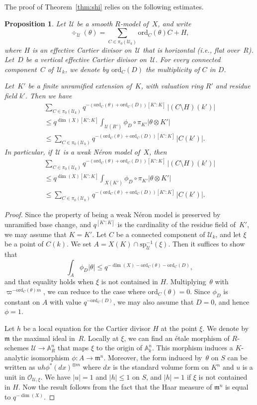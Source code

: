 \documentclass[11pt]{article}
\let\mathcal\mathscr
\newtheorem{prop}[equation]{Proposition}
\theoremstyle{definition}
\numberwithin{equation}{subsection}
\newcommand{\A}{\ensuremath{\mathbb{A}}}
\newcommand{\cU}{\ensuremath{\mathscr{U}}}
\newcommand{\ord}{\mathrm{ord}}
\newcommand{\spe}{\mathrm{sp}}
\let\form\theta
\let\unif\varpi
\begin{document}
The proof of Theorem~\ref{thm:shi} relies on the following estimates.
\begin{prop}\label{prop:int}
Let~$\cU$ be a smooth $R$\nobreakdash-model of~$X$, and write
\[
\div_{\cU}(\form)=\sum_{C\in \pi_0(\cU_k)}\ord_C(\form)C+H,
\]
where $H$ is an effective Cartier divisor on~$\cU$ that is horizontal (i.e., flat over~$R$).
Let~$D$ be a vertical effective Cartier divisor on~$\cU$. For every connected component~$C$ of~$\cU_k$, we denote by $\ord_C(D)$ the multiplicity of $C$ in $D$.

Let~$K'$ be a finite unramified extension of~$K$, with valuation ring $R'$ and residue field $k'$.
Then we have
\begin{multline*}
\sum_{C\in \pi_0(\cU_k)}q^{-(\ord_C(\form)+\ord_C(D))[K'\colon K]}\,|(C\setminus H)(k')|\\[-8pt]
\leq q^{\dim(X)[K'\colon K]} \int_{\cU(R')}\phi_D\circ\pi_{K'} |\form\otimes K'| \\
\leq \sum_{C\in \pi_0(\cU_k)}q^{-(\ord_C(\form)+\ord_C(D))[K'\colon K]}\,|C(k')|.
\end{multline*}
In particular, if~$\cU$ is a weak Néron model of~$X$, then
\begin{multline*}
\sum_{C\in \pi_0(\cU_k)}q^{-(\ord_C(\form)+\ord_C(D))[K'\colon K]}\,|(C\setminus H)(k')|\\[-8pt]
\leq q^{\dim(X)[K'\colon K]} \int_{X(K')}\phi_D\circ\pi_{K'} |\form\otimes K'| \\
\leq \sum_{C\in \pi_0(\cU_k)}q^{-(\ord_C(\form)+\ord_C(D))[K'\colon K]}\,|C(k')|.
\end{multline*}
\end{prop}
\begin{proof}
Since the property of being a weak Néron model is preserved by unramified base change, and $q^{[K'\colon K]}$ is the cardinality of the residue field of~$K'$, we may assume that $K=K'$.
Let $C$ be a connected component of $\cU_k$, and let $\xi$ be a point of $C(k)$.
We set $A=X(K)\cap \spe_{\cU}^{-1}(\xi)$.
Then it suffices to show that
\[
\int_{A}\phi_D|\form| \leq q^{-\dim(X)-\ord_C(\form)-\ord_C(D)},
\]
and that equality holds when $\xi$ is not contained in $H$. Multiplying~$\form$ with $\unif^{-\ord_C(\form)m}$, we can reduce to the case where
$\ord_C(\form)=0$. Since $\phi_D$ is constant on $A$ with value $q^{-\ord_C(D)}$, we may also assume that $D=0$, and hence $\phi=1$.

Let $h$ be a local equation for the Cartier divisor $H$ at the point $\xi$.
We denote by~$\mathfrak{m}$ the maximal ideal in~$R$.
Locally at $\xi$, we can find an étale morphism of $R$\nobreakdash-schemes $\cU\to \A^n_R$ that maps $\xi$ to the origin of $\A^n_k$.
This morphism induces a $K$\nobreakdash-analytic isomorphism $\phi:A\to \mathfrak{m}^n$. Moreover,
the form induced by~$\form$ on $S$ can be written as $uh\phi^*(dx)^{\otimes m}$ where $dx$ is the standard volume form on $K^n$ and $u$ is a unit in $\mathcal{O}_{\cU,\xi}$.
We have $|u|=1$ and $|h|\leq 1$ on $S$, and $|h|=1$ if $\xi$ is not contained in $H$. Now the result follows from the fact that the Haar measure of $\mathfrak{m}^n$ is equal to $q^{-\dim(X)}$.
\end{proof}
\end{document}
